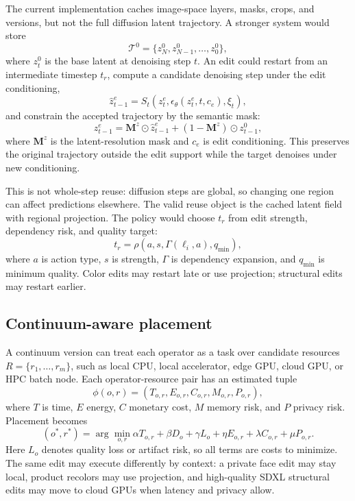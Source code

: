 \documentclass[final,5p,times,number,sort&compress]{elsarticle}
\newcommand{\mask}{\mathbf{M}}
\begin{document}
The current implementation caches image-space layers, masks, crops, and versions, but not the full diffusion latent trajectory. A stronger system would store
\begin{equation}
    \mathcal{T}^{0} = \{z^{0}_{N},z^{0}_{N-1},\ldots,z^{0}_{0}\},
\end{equation}
where \(z^{0}_{t}\) is the base latent at denoising step \(t\). An edit could restart from an intermediate timestep \(t_r\), compute a candidate denoising step under the edit conditioning,
\begin{equation}
    \hat{z}^{e}_{t-1}
    =
    S_t\!\left(z^{e}_{t}, \epsilon_\theta(z^{e}_{t},t,c_e), \xi_t\right),
\end{equation}
and constrain the accepted trajectory by the semantic mask:
\begin{equation}
    z^{e}_{t-1}
    =
    \mask^{z}\odot \hat{z}^{e}_{t-1}
    +
    (1-\mask^{z})\odot z^{0}_{t-1},
\end{equation}
where \(\mask^{z}\) is the latent-resolution mask and \(c_e\) is edit conditioning. This preserves the original trajectory outside the edit support while the target denoises under new conditioning.

This is not whole-step reuse: diffusion steps are global, so changing one region can affect predictions elsewhere. The valid reuse object is the cached latent field with regional projection. The policy would choose \(t_r\) from edit strength, dependency risk, and quality target:
\begin{equation}
    t_r = \rho(a, s, \Gamma(\ell_i,a), q_{\min}),
\end{equation}
where \(a\) is action type, \(s\) is strength, \(\Gamma\) is dependency expansion, and \(q_{\min}\) is minimum quality. Color edits may restart late or use projection; structural edits may restart earlier.

\subsection{Continuum-aware placement}

A continuum version can treat each operator as a task over candidate resources \(R=\{r_1,\ldots,r_m\}\), such as local CPU, local accelerator, edge GPU, cloud GPU, or HPC batch node. Each operator-resource pair has an estimated tuple
\begin{equation}
    \phi(o,r) = (T_{o,r}, E_{o,r}, C_{o,r}, M_{o,r}, P_{o,r}),
\end{equation}
where \(T\) is time, \(E\) energy, \(C\) monetary cost, \(M\) memory risk, and \(P\) privacy risk. Placement becomes
\begin{equation}
    (o^*,r^*) =
    \arg\min_{o,r}
    \alpha T_{o,r}+\beta D_o+\gamma L_o+\eta E_{o,r}+\lambda C_{o,r}+\mu P_{o,r}.
\end{equation}
Here \(L_o\) denotes quality loss or artifact risk, so all terms are costs to minimize.
The same edit may execute differently by context: a private face edit may stay local, product recolors may use projection, and high-quality SDXL structural edits may move to cloud GPUs when latency and privacy allow.
\end{document}
